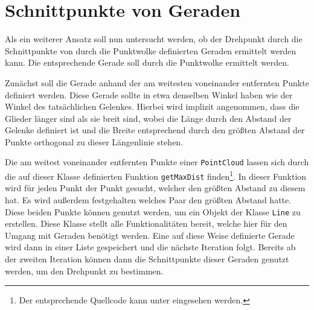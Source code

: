 


\section{Schnittpunkte von Geraden}\label{ch:schnittpunkt_gerade}

Als ein weiterer Ansatz soll nun untersucht werden, ob der Drehpunkt durch die Schnittpunkte von durch die Punktwolke definierten Geraden ermittelt werden kann.
Die entsprechende Gerade soll durch die Punktwolke ermittelt werden.

Zunächst soll die Gerade anhand der am weitesten voneinander entfernten Punkte definiert werden.
Diese Gerade sollte in etwa denselben Winkel haben wie der Winkel des tatsächlichen Gelenkes.
Hierbei wird implizit angenommen, dass die Glieder länger sind als sie breit sind, wobei die Länge durch den Abstand der Gelenke definiert ist und die Breite entsprechend durch den größten Abstand der Punkte orthogonal zu dieser Längenlinie stehen.

Die am weitest voneinander entfernten Punkte einer \lstinline{PointCloud} lassen sich durch die auf dieser Klasse definierten Funktion \lstinline{getMaxDist} finden\footnote{Der entsprechende Quellcode kann unter  eingesehen werden.}.
In dieser Funktion wird für jeden Punkt der Punkt gesucht, welcher den grö{\ss}ten Abstand zu diesem hat. Es wird au{\ss}erdem festgehalten welches Paar den grö{\ss}ten Abstand hatte.
Diese beiden Punkte können genutzt werden, um ein Objekt der Klasse \lstinline{Line} zu erstellen.
Diese Klasse stellt alle Funktionalitäten bereit, welche hier für den Umgang mit Geraden benötigt werden.
Eine auf diese Weise definierte Gerade wird dann in einer Liste gespeichert und die nächste Iteration folgt.
Bereits ab der zweiten Iteration können dann die Schnittpunkte dieser Geraden genutzt werden, um den Drehpunkt zu bestimmen.

